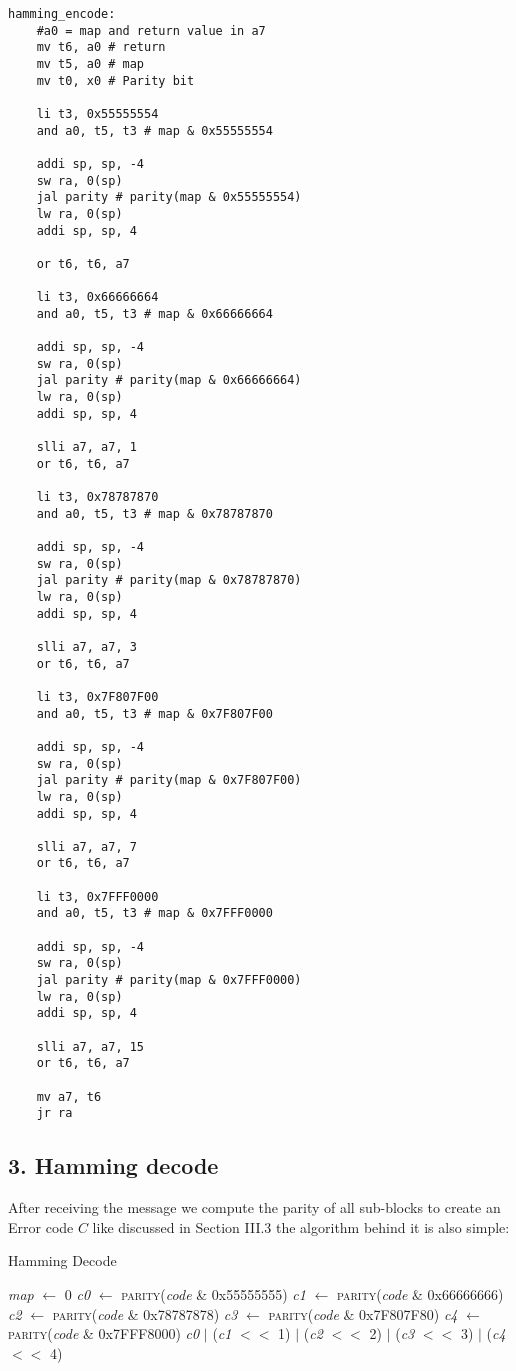 \documentclass[11pt]{article}
\begin{document}
\begin{lstlisting}[language=RISC-V]
hamming_encode:
    #a0 = map and return value in a7
    mv t6, a0 # return
    mv t5, a0 # map
    mv t0, x0 # Parity bit
    
    li t3, 0x55555554 
    and a0, t5, t3 # map & 0x55555554

    addi sp, sp, -4
    sw ra, 0(sp)
    jal parity # parity(map & 0x55555554)
    lw ra, 0(sp)
    addi sp, sp, 4

    or t6, t6, a7

    li t3, 0x66666664
    and a0, t5, t3 # map & 0x66666664
    
    addi sp, sp, -4
    sw ra, 0(sp)
    jal parity # parity(map & 0x66666664)
    lw ra, 0(sp)
    addi sp, sp, 4

    slli a7, a7, 1
    or t6, t6, a7

    li t3, 0x78787870
    and a0, t5, t3 # map & 0x78787870
    
    addi sp, sp, -4
    sw ra, 0(sp)
    jal parity # parity(map & 0x78787870)
    lw ra, 0(sp)
    addi sp, sp, 4

    slli a7, a7, 3
    or t6, t6, a7

    li t3, 0x7F807F00
    and a0, t5, t3 # map & 0x7F807F00

    addi sp, sp, -4
    sw ra, 0(sp)
    jal parity # parity(map & 0x7F807F00)
    lw ra, 0(sp)
    addi sp, sp, 4

    slli a7, a7, 7
    or t6, t6, a7

    li t3, 0x7FFF0000
    and a0, t5, t3 # map & 0x7FFF0000

    addi sp, sp, -4
    sw ra, 0(sp)
    jal parity # parity(map & 0x7FFF0000)
    lw ra, 0(sp)
    addi sp, sp, 4

    slli a7, a7, 15
    or t6, t6, a7

    mv a7, t6
    jr ra
\end{lstlisting} 

\subsection*{3. Hamming decode}
After receiving the message we compute the parity of all sub-blocks to create an Error code $C$ like discussed in Section III.3 the algorithm behind it is also simple: 

\begin{algorithm}[H]
\caption{Hamming Decode}
\begin{algorithmic}[1]
    \State \textit{map} $\gets$ 0 
    \State \textit{c0} $\gets$ \textsc{parity}(\textit{code} \& 0x55555555)
    \State \textit{c1} $\gets$ \textsc{parity}(\textit{code} \& 0x66666666)
    \State \textit{c2} $\gets$ \textsc{parity}(\textit{code} \& 0x78787878)
    \State \textit{c3} $\gets$ \textsc{parity}(\textit{code} \& 0x7F807F80)
    \State \textit{c4} $\gets$ \textsc{parity}(\textit{code} \& 0x7FFF8000)
    \State \Return \textit{c0} $|$ (\textit{c1} $<<$ 1) $|$ (\textit{c2} $<<$ 2) $|$ (\textit{c3} $<<$ 3) $|$ (\textit{c4} $<<$ 4)
\EndFunction
\end{algorithmic}
\end{algorithm}
\end{document}
